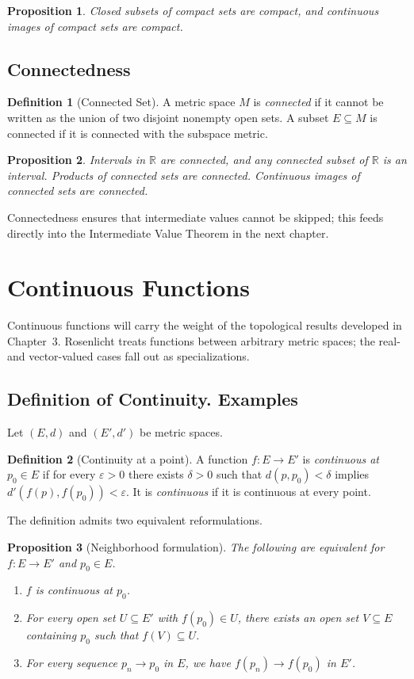 \documentclass{article}
\theoremstyle{definition}
\newtheorem{definition}{Definition}[section]
\theoremstyle{plain}
\newtheorem{proposition}{Proposition}[section]
\begin{document}
\begin{proposition}
Closed subsets of compact sets are compact, and continuous images of compact sets are compact.
\end{proposition}

	\subsection{Connectedness}\label{subsec:connectedness}
\begin{definition}[Connected Set]
A metric space $M$ is \emph{connected} if it cannot be written as the union of two disjoint nonempty open sets. A subset $E\subseteq M$ is connected if it is connected with the subspace metric.
\end{definition}

\begin{proposition}
Intervals in $\mathbb{R}$ are connected, and any connected subset of $\mathbb{R}$ is an interval. Products of connected sets are connected. Continuous images of connected sets are connected.
\end{proposition}

Connectedness ensures that intermediate values cannot be skipped; this feeds directly into the Intermediate Value Theorem in the next chapter.
\section{Continuous Functions}\label{sec:continuous-functions}
Continuous functions will carry the weight of the topological results developed in Chapter~3. Rosenlicht treats functions between arbitrary metric spaces; the real- and vector-valued cases fall out as specializations.

\subsection{Definition of Continuity. Examples}\label{subsec:continuity-definition}
Let $(E,d)$ and $(E',d')$ be metric spaces.
\begin{definition}[Continuity at a point]\label{def:continuity}
	A function $f\colon E \to E'$ is \emph{continuous at $p_0\in E$} if for every $\varepsilon>0$ there exists $\delta>0$ such that $d(p,p_0)<\delta$ implies $d'(f(p),f(p_0))<\varepsilon$. It is \emph{continuous} if it is continuous at every point.
\end{definition}

The definition admits two equivalent reformulations.
\begin{proposition}[Neighborhood formulation]\label{prop:cont-neighborhood}
	The following are equivalent for $f\colon E\to E'$ and $p_0\in E$.
	\begin{enumerate}
		\item $f$ is continuous at $p_0$.
		\item For every open set $U\subseteq E'$ with $f(p_0)\in U$, there exists an open set $V\subseteq E$ containing $p_0$ such that $f(V)\subseteq U$.
		\item For every sequence $p_n\to p_0$ in $E$, we have $f(p_n)\to f(p_0)$ in $E'$.
	\end{enumerate}
\end{proposition}
\end{document}
